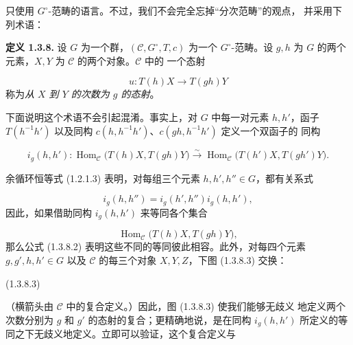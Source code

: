 \clearpage
{}%
只使用 $G^\circ$-范畴的语言。不过，我们不会完全忘掉“分次范畴”的观点，
并采用下列术语：

\noindent\textbf{定义 1.3.8.}\quad
设 $G$ 为一个群，$(\mathcal C,G^\circ,T,c)$ 为一个 $G^\circ$-范畴。设
$g,h$ 为 $G$ 的两个元素，$X,Y$ 为 $\mathcal C$ 的两个对象。$\mathcal C$ 中的
一个态射

\[
  u\colon T(h)X\longrightarrow T(gh)Y
\]
称为\emph{从 $X$ 到 $Y$ 的次数为 $g$ 的态射}。

下面说明这个术语不会引起混淆。事实上，对 $G$ 中每一对元素 $h,h'$，函子
$T(h^{-1}h')$ 以及同构 $c(h,h^{-1}h')$、$c(gh,h^{-1}h')$ 定义一个双函子的
同构

\begin{equation}
  i_g(h,h')\colon
  \operatorname{Hom}_{\mathcal C}\bigl(T(h)X,T(gh)Y\bigr)
  \overset{\sim}{\longrightarrow}
  \operatorname{Hom}_{\mathcal C}\bigl(T(h')X,T(gh')Y\bigr).
  \tag{1.3.8.1}
\end{equation}

余循环恒等式 (1.2.1.3) 表明，对每组三个元素 $h,h',h''\in G$，都有关系式

\begin{equation}
  i_g(h,h'')=i_g(h',h'')i_g(h,h'),
  \tag{1.3.8.2}
\end{equation}
因此，如果借助同构 $i_g(h,h')$ 来等同各个集合

\[
  \operatorname{Hom}_{\mathcal C}\bigl(T(h)X,T(gh)Y\bigr),
\]
那么公式 (1.3.8.2) 表明这些不同的等同彼此相容。此外，对每四个元素
$g,g',h,h'\in G$ 以及 $\mathcal C$ 的每三个对象 $X,Y,Z$，下图 (1.3.8.3)
交换：

\begin{center}
  \hfill\textup{(1.3.8.3)}
\end{center}

（横箭头由 $\mathcal C$ 中的复合定义。）因此，图 (1.3.8.3) 使我们能够无歧义
地定义两个次数分别为 $g$ 和 $g'$ 的态射的复合；更精确地说，是在同构
$i_g(h,h')$ 所定义的等同之下无歧义地定义。立即可以验证，这个复合定义与
